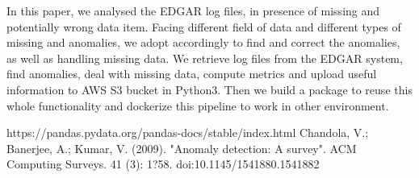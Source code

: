 \documentclass[conference]{IEEEtran}
\begin{document}
\indent In this paper, we analysed the EDGAR log files, in presence of missing and potentially wrong data item. Facing different field of data and different types of missing and anomalies, we adopt accordingly to find and correct the anomalies, as well as handling missing data. We retrieve log files from the EDGAR system, find anomalies, deal with missing data, compute metrics and upload useful information to AWS S3 bucket in Python3. Then we build a package to reuse this whole functionality and dockerize this pipeline to work in other environment.
\\
%
\begin{thebibliography}{1}
\bibitem
https://pandas.pydata.org/pandas-docs/stable/index.html
Chandola, V.; Banerjee, A.; Kumar, V. (2009). "Anomaly detection: A survey". ACM Computing Surveys. 41 (3): 1?58. doi:10.1145/1541880.1541882
\end{thebibliography}
\end{document}
